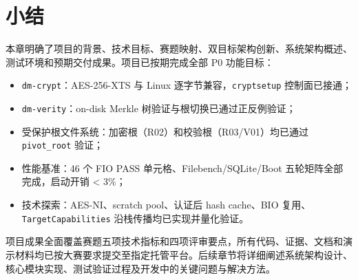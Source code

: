 \section{小结}

本章明确了项目的背景、技术目标、赛题映射、双目标架构创新、系统架构概述、测试环境和预期交付成果。项目已按期完成全部 P0 功能目标：

\begin{itemize}
    \item \texttt{dm-crypt}：AES-256-XTS 与 Linux 逐字节兼容，\texttt{cryptsetup} 控制面已接通；
    \item \texttt{dm-verity}：on-disk Merkle 树验证与根切换已通过正反例验证；
    \item 受保护根文件系统：加密根（R02）和校验根（R03/V01）均已通过 \texttt{pivot\_root} 验证；
    \item 性能基准：46 个 FIO PASS 单元格、Filebench/SQLite/Boot 五轮矩阵全部完成，启动开销 < 3\%；
    \item 技术探索：AES-NI、scratch pool、认证后 hash cache、BIO 复用、\texttt{TargetCapabilities} 沿栈传播均已实现并量化验证。
\end{itemize}

项目成果全面覆盖赛题五项技术指标和四项评审要点，所有代码、证据、文档和演示材料均已按大赛要求提交至指定托管平台。后续章节将详细阐述系统架构设计、核心模块实现、测试验证过程及开发中的关键问题与解决方法。

